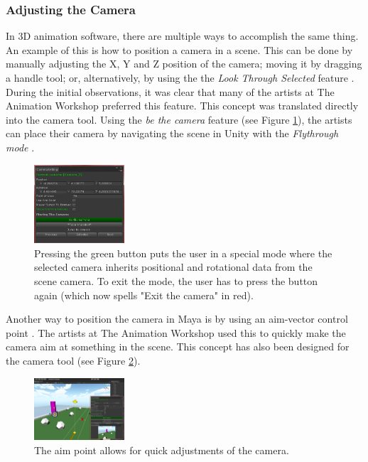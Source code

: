\subsubsection{Adjusting the Camera}
In 3D animation software, there are multiple ways to accomplish the same thing. An example of this is how to position a camera in a scene. This can be done by manually adjusting the X, Y and Z position of the camera; moving it by dragging a handle tool; or, alternatively, by using the the \textit{Look Through Selected} feature \cite{maya_lookThrough}. During the initial observations, it was clear that many of the artists at The Animation Workshop preferred this feature. This concept was translated directly into the camera tool. Using the \textit{be the camera} feature (see Figure \ref{fig:beTheCam}), the artists can place their camera by navigating the scene in Unity with the \textit{Flythrough mode} \cite{unity_flyMode}.

\begin{figure}[htbp]
\centering
\includegraphics[width=0.3\textwidth]{Pics/be_the_cam_new}
\caption{Pressing the green button puts the user in a special mode where the selected camera inherits positional and rotational data from the scene camera. To exit the mode, the user has to press the button again (which now spells "Exit the camera" in red).}
\label{fig:beTheCam}
\end{figure}

Another way to position the camera in Maya is by using an aim-vector control point \cite{maya_camAim}. The artists at The Animation Workshop used this to quickly make the camera aim at something in the scene. This concept has also been designed for the camera tool (see Figure \ref{fig:aimPoint}).

\begin{figure}[htbp]
\centering
\includegraphics[width=0.3\textwidth]{Pics/aimPoint}
\caption{The aim point allows for quick adjustments of the camera.}
\label{fig:aimPoint}
\end{figure}

